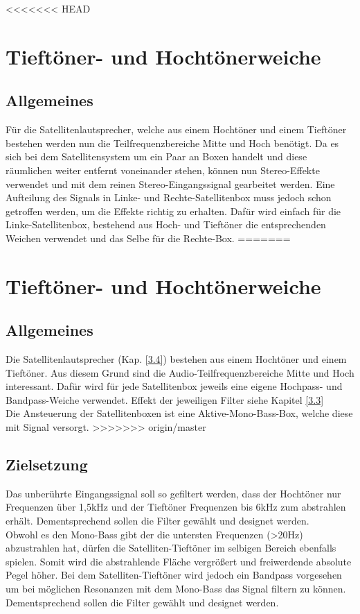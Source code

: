 \null\newpage
<<<<<<< HEAD
\section{Tieftöner- und Hochtönerweiche}\label{sec:4.2}
\subsection{Allgemeines}\label{subsec:4.2.1}
Für die Satellitenlautsprecher, welche aus einem Hochtöner und einem Tieftöner bestehen werden nun die Teilfrequenzbereiche Mitte und Hoch benötigt. Da es sich bei dem Satellitensystem um ein Paar an Boxen handelt und diese räumlichen weiter entfernt voneinander stehen, können nun Stereo-Effekte verwendet und mit dem reinen Stereo-Eingangssignal gearbeitet werden. Eine Aufteilung des Signals in Linke- und Rechte-Satellitenbox muss jedoch schon getroffen werden, um die Effekte richtig zu erhalten. Dafür wird einfach für die Linke-Satellitenbox, bestehend aus Hoch- und Tieftöner die entsprechenden Weichen verwendet und das Selbe für die Rechte-Box.
=======
\section{Tieftöner- und Hochtönerweiche}\label{sec:5.2}
\subsection{Allgemeines}\label{subsec:5.2.1}
Die Satellitenlautsprecher (Kap. \ref{3.4}) bestehen aus einem Hochtöner und einem Tieftöner. Aus diesem Grund sind die Audio-Teilfrequenzbereiche Mitte und Hoch interessant. Dafür wird  für jede Satellitenbox jeweils eine eigene Hochpass- und Bandpass-Weiche verwendet. Effekt der jeweiligen Filter siehe Kapitel \ref{3.3}\\
Die  Ansteuerung der Satellitenboxen ist eine Aktive-Mono-Bass-Box, welche diese mit Signal versorgt. 
>>>>>>> origin/master

\subsection{Zielsetzung}\label{subsec:4.2.2}
Das unberührte Eingangssignal soll so gefiltert werden, dass der Hochtöner nur Frequenzen über 1,5kHz und der Tieftöner Frequenzen bis 6kHz zum abstrahlen erhält. Dementsprechend sollen die Filter gewählt und designet werden.\\
Obwohl es den Mono-Bass gibt der die untersten Frequenzen (>20Hz) abzustrahlen hat, dürfen die Satelliten-Tieftöner im selbigen Bereich ebenfalls spielen. Somit wird die abstrahlende Fläche vergrößert und freiwerdende absolute Pegel höher. Bei dem Satelliten-Tieftöner wird jedoch ein Bandpass vorgesehen um bei möglichen Resonanzen mit dem Mono-Bass das Signal filtern zu können.\\
Dementsprechend sollen die Filter gewählt und designet werden.

